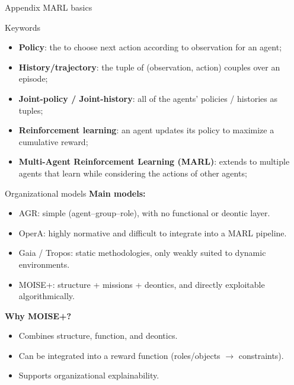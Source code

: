 \begin{frame}{Appendix}
    {MARL basics}

    \begin{block}{Keywords}
        \begin{itemize}
            \item \textbf{Policy}: the  to choose next action according to observation for an agent;
            \item \textbf{History/trajectory}: the tuple of (observation, action) couples over an episode;
            \item \textbf{Joint-policy / Joint-history}: all of the agents' policies / histories as tuples;
            \item \textbf{Reinforcement learning}: an agent updates its policy to maximize a cumulative reward;
            \item \textbf{Multi-Agent Reinforcement Learning (MARL)}: extends to multiple agents that learn while considering the actions of other agents;
        \end{itemize}
    \end{block}

\end{frame}

\begin{frame}{Organizational models}
    \textbf{Main models:}
    \begin{itemize}
        \item AGR: simple (agent--group--role), with no functional or deontic layer.
        \item OperA: highly normative and difficult to integrate into a MARL pipeline.
        \item Gaia / Tropos: static methodologies, only weakly suited to dynamic environments.
        \item MOISE+: structure + missions + deontics, and directly exploitable algorithmically.
    \end{itemize}

    \textbf{Why MOISE+?}
    \begin{itemize}
        \item Combines structure, function, and deontics.
        \item Can be integrated into a reward function (roles/objects $\rightarrow$ constraints).
        \item Supports organizational explainability.
    \end{itemize}
\end{frame}

